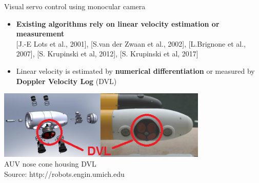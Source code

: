 \documentclass{beamer}
\begin{document}
\begin{frame}{Visual servo control using monocular camera}
	\begin{itemize}
		
		\item {\color{red} \textbf{Existing algorithms rely on linear velocity  estimation or measurement}} \\{\scriptsize  [J.-E Lots et al., 2001], [S.van der Zwaan et al., 2002], [L.Brignone et al., 2007], [S. Krupinski et al, 2012], [S. Krupinski et al, 2017]}
		\pause
		\item Linear velocity is estimated by \textbf{numerical differentiation} or measured by \textbf{Doppler Velocity Log} (DVL)
	\end{itemize}

\centering
\includegraphics[width = 100mm]{Images/DVL_5.png}\\
{\footnotesize AUV nose cone housing DVL}\\
{\color{blue}\tiny Source: http://robots.engin.umich.edu}

	
		
	
 
\end{frame}
\end{document}
